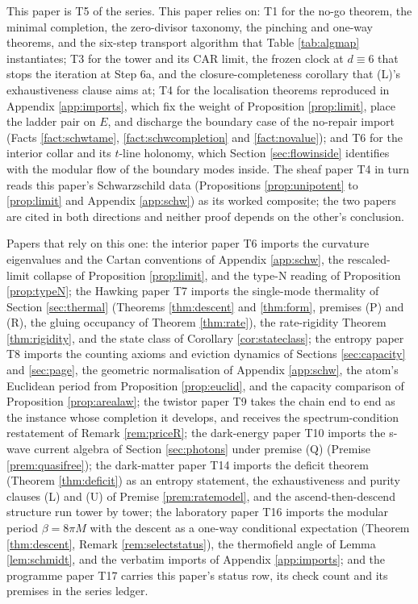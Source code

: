 \documentclass[11pt]{article}
\theoremstyle{definition}
\begin{document}
This paper is T5 of the series. This paper relies on: T1 \cite{ButlerT1} for the no-go theorem, the minimal completion, the zero-divisor taxonomy, the pinching and one-way theorems, and the six-step transport algorithm that Table \ref{tab:algmap} instantiates; T3 \cite{ButlerT3} for the tower and its CAR limit, the frozen clock at $d \equiv 6$ that stops the iteration at Step 6a, and the closure-completeness corollary that (L)'s exhaustiveness clause aims at; T4 \cite{ButlerT4} for the localisation theorems reproduced in Appendix \ref{app:imports}, which fix the weight of Proposition \ref{prop:limit}, place the ladder pair on $E$, and discharge the boundary case of the no-repair import (Facts \ref{fact:schwtame}, \ref{fact:schwcompletion} and \ref{fact:novalue}); and T6 \cite{ButlerT6} for the interior collar and its $t$-line holonomy, which Section \ref{sec:flowinside} identifies with the modular flow of the boundary modes inside. The sheaf paper T4 in turn reads this paper's Schwarzschild data (Propositions \ref{prop:unipotent} to \ref{prop:limit} and Appendix \ref{app:schw}) as its worked composite; the two papers are cited in both directions and neither proof depends on the other's conclusion.

Papers that rely on this one: the interior paper T6 \cite{ButlerT6} imports the curvature eigenvalues and the Cartan conventions of Appendix \ref{app:schw}, the rescaled-limit collapse of Proposition \ref{prop:limit}, and the type-N reading of Proposition \ref{prop:typeN}; the Hawking paper T7 \cite{ButlerT7} imports the single-mode thermality of Section \ref{sec:thermal} (Theorems \ref{thm:descent} and \ref{thm:form}, premises (P) and (R), the gluing occupancy of Theorem \ref{thm:rate}), the rate-rigidity Theorem \ref{thm:rigidity}, and the state class of Corollary \ref{cor:stateclass}; the entropy paper T8 \cite{ButlerT8} imports the counting axioms and eviction dynamics of Sections \ref{sec:capacity} and \ref{sec:page}, the geometric normalisation of Appendix \ref{app:schw}, the atom's Euclidean period from Proposition \ref{prop:euclid}, and the capacity comparison of Proposition \ref{prop:arealaw}; the twistor paper T9 \cite{ButlerT9} takes the chain end to end as the instance whose completion it develops, and receives the spectrum-condition restatement of Remark \ref{rem:priceR}; the dark-energy paper T10 \cite{ButlerT10} imports the s-wave current algebra of Section \ref{sec:photons} under premise (Q) (Premise \ref{prem:quasifree}); the dark-matter paper T14 \cite{ButlerT14} imports the deficit theorem (Theorem \ref{thm:deficit}) as an entropy statement, the exhaustiveness and purity clauses (L) and (U) of Premise \ref{prem:ratemodel}, and the ascend-then-descend structure run tower by tower; the laboratory paper T16 \cite{ButlerT16} imports the modular period $\beta = 8\pi M$ with the descent as a one-way conditional expectation (Theorem \ref{thm:descent}, Remark \ref{rem:selectstatus}), the thermofield angle of Lemma \ref{lem:schmidt}, and the verbatim imports of Appendix \ref{app:imports}; and the programme paper T17 \cite{ButlerT17} carries this paper's status row, its check count and its premises in the series ledger.
\end{document}
